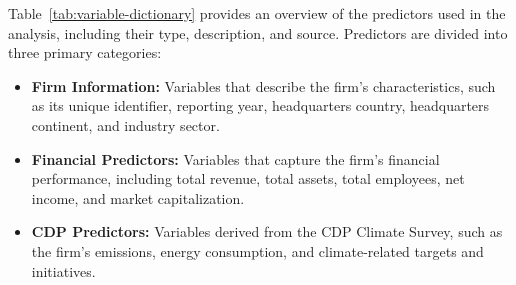 \noindent Table~\ref{tab:variable-dictionary} provides an overview of the predictors used in the analysis, including their type, description, and source. Predictors are divided into three primary categories: \begin{itemize}
    \item \textbf{Firm Information:} Variables that describe the firm's characteristics, such as its unique identifier, reporting year, headquarters country, headquarters continent, and industry sector.
    \item \textbf{Financial Predictors:} Variables that capture the firm's financial performance, including total revenue, total assets, total employees, net income, and market capitalization.
    \item \textbf{CDP Predictors:} Variables derived from the CDP Climate Survey, such as the firm's emissions, energy consumption, and climate-related targets and initiatives.
\end{itemize}


